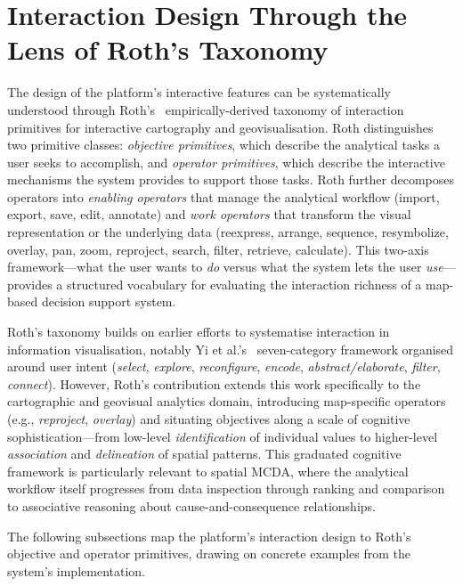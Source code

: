 
\section{Interaction Design Through the Lens of Roth's Taxonomy}
\label{sec:roth-taxonomy}

The design of the platform's interactive features can be systematically understood through Roth's~\cite{roth2013taxonomy} empirically-derived taxonomy of interaction primitives for interactive cartography and geovisualisation. Roth distinguishes two primitive classes: \emph{objective primitives}, which describe the analytical tasks a user seeks to accomplish, and \emph{operator primitives}, which describe the interactive mechanisms the system provides to support those tasks. Roth further decomposes operators into \emph{enabling operators} that manage the analytical workflow (import, export, save, edit, annotate) and \emph{work operators} that transform the visual representation or the underlying data (reexpress, arrange, sequence, resymbolize, overlay, pan, zoom, reproject, search, filter, retrieve, calculate). This two-axis framework---what the user wants to \emph{do} versus what the system lets the user \emph{use}---provides a structured vocabulary for evaluating the interaction richness of a map-based decision support system.

Roth's taxonomy builds on earlier efforts to systematise interaction in information visualisation, notably Yi et al.'s~\cite{yi2007interaction} seven-category framework organised around user intent (\emph{select}, \emph{explore}, \emph{reconfigure}, \emph{encode}, \emph{abstract/elaborate}, \emph{filter}, \emph{connect}). However, Roth's contribution extends this work specifically to the cartographic and geovisual analytics domain, introducing map-specific operators (e.g., \emph{reproject}, \emph{overlay}) and situating objectives along a scale of cognitive sophistication---from low-level \emph{identification} of individual values to higher-level \emph{association} and \emph{delineation} of spatial patterns. This graduated cognitive framework is particularly relevant to spatial MCDA, where the analytical workflow itself progresses from data inspection through ranking and comparison to associative reasoning about cause-and-consequence relationships.

The following subsections map the platform's interaction design to Roth's objective and operator primitives, drawing on concrete examples from the system's implementation.

